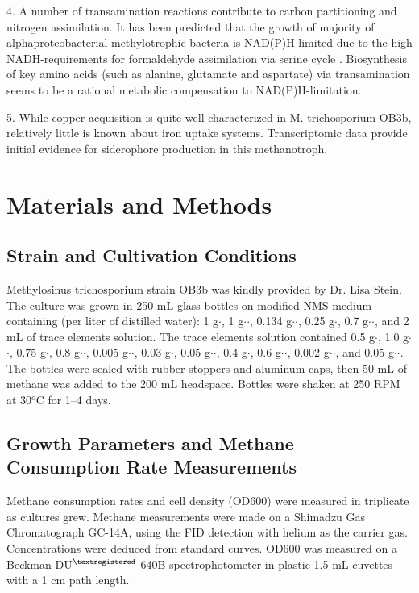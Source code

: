4. A number of transamination reactions contribute to carbon partitioning and nitrogen assimilation.
It has been predicted that the growth of majority of alphaproteobacterial methylotrophic bacteria is NAD(P)H-limited due to the high NADH-requirements for formaldehyde assimilation via serine cycle \cite{anthony1978}.
Biosynthesis of key amino acids (such as alanine, glutamate and aspartate) via transamination seems to be a rational metabolic compensation to NAD(P)H-limitation.

5. While copper acquisition is quite well characterized in M. trichosporium OB3b, relatively little is known about iron uptake systems.
Transcriptomic data provide initial evidence for siderophore production in this methanotroph.

\section{Materials and Methods}
\subsection{Strain and Cultivation Conditions}
Methylosinus trichosporium strain OB3b was kindly provided by Dr. Lisa Stein.
The culture was grown in 250 mL glass bottles on modified NMS medium \cite{whittenbury1970} containing (per liter of distilled water): 1 g$\cdot$, 1 g$\cdot$$\cdot$, 0.134 g$\cdot$$\cdot$, 0.25 g$\cdot$, 0.7 g$\cdot$$\cdot$, and 2 mL of trace elements solution.
The trace elements solution contained 0.5 g$\cdot$, 1.0 g$\cdot$$\cdot$, 0.75 g$\cdot$, 0.8 g$\cdot$$\cdot$, 0.005 g$\cdot$$\cdot$, 0.03 g$\cdot$, 0.05 g$\cdot$$\cdot$, 0.4 g$\cdot$, 0.6 g$\cdot$$\cdot$, 0.002 g$\cdot$$\cdot$, and 0.05 g$\cdot$$\cdot$.
The bottles were sealed with rubber stoppers and aluminum caps, then 50 mL of methane was added to the 200 mL headspace.
Bottles were shaken at 250 RPM at 30$^o$C for 1–4 days.

\subsection{Growth Parameters and Methane Consumption Rate Measurements}
Methane consumption rates and cell density (OD600) were measured in triplicate as cultures grew.
Methane measurements were made on a Shimadzu Gas Chromatograph GC-14A, using the FID detection with helium as the carrier gas.
Concentrations were deduced from standard curves.
OD600 was measured on a Beckman DU$^{\textregistered}$ 640B spectrophotometer in plastic 1.5 mL cuvettes with a 1 cm path length.

